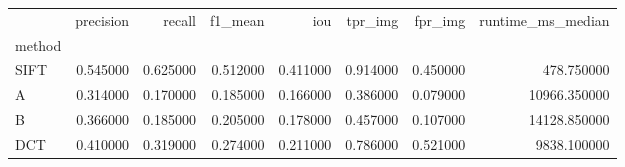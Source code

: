 \begin{tabular}{lrrrrrrr}
\toprule
 & precision & recall & f1_mean & iou & tpr_img & fpr_img & runtime_ms_median \\
method &  &  &  &  &  &  &  \\
\midrule
SIFT & 0.545000 & 0.625000 & 0.512000 & 0.411000 & 0.914000 & 0.450000 & 478.750000 \\
A & 0.314000 & 0.170000 & 0.185000 & 0.166000 & 0.386000 & 0.079000 & 10966.350000 \\
B & 0.366000 & 0.185000 & 0.205000 & 0.178000 & 0.457000 & 0.107000 & 14128.850000 \\
DCT & 0.410000 & 0.319000 & 0.274000 & 0.211000 & 0.786000 & 0.521000 & 9838.100000 \\
\bottomrule
\end{tabular}
